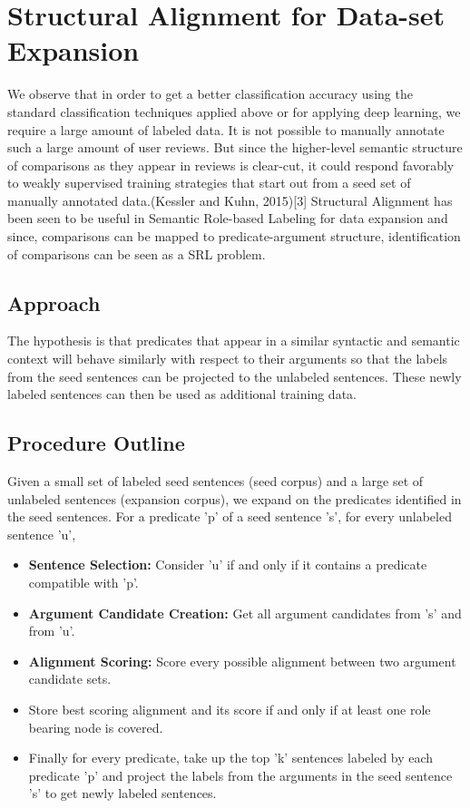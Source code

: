 \documentclass[12pt]{article}
\begin{document}
\section {Structural Alignment for Data-set Expansion}
We observe that in order to get a better classification accuracy using the standard classification techniques applied above or for applying deep learning, we require a large amount of labeled data. It is not possible to manually annotate such a large amount of user reviews. But since the higher-level semantic structure of comparisons as they appear in reviews is clear-cut, it could respond favorably to weakly supervised training strategies that start out from a seed set of manually annotated data.(Kessler and Kuhn, 2015)[3] Structural Alignment has been seen to be useful in Semantic Role-based Labeling for data expansion and since, comparisons can be mapped to predicate-argument structure, identification of comparisons can be seen as a SRL problem.

\subsection{Approach}
The hypothesis is that predicates that appear in a similar syntactic and semantic context will behave similarly with respect to their arguments so that the labels from the seed sentences can be projected to the unlabeled sentences. These newly labeled sentences can then be used as additional training data.

\subsection{Procedure Outline}
Given a small set of labeled seed sentences (seed corpus) and a large set of unlabeled sentences (expansion corpus), we expand on the predicates identified in the seed sentences. For a predicate 'p' of a seed sentence 's', for every unlabeled sentence 'u', 
\begin{itemize}
\item \textbf{Sentence Selection: } Consider 'u' if and only if it contains a predicate compatible with 'p'.
\item \textbf{Argument Candidate Creation: } Get all argument candidates from 's' and from 'u'.
\item \textbf{Alignment Scoring: } Score every possible alignment between two argument candidate sets.
\item Store best scoring alignment and its score if and only if at least one role bearing node is covered.
\item Finally for every predicate, take up the top 'k' sentences labeled by each predicate 'p' and project the labels from the arguments in the seed sentence 's' to get newly labeled sentences.
\end{itemize}
\end{document}
